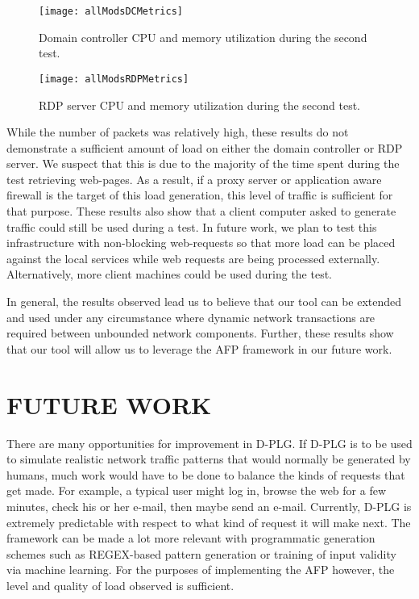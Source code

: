 \begin{figure}[!ht] \centering
  \texttt{[image: allModsDCMetrics]}
  \caption[Test 2:  Domain Controller Metrics]{Domain controller CPU and memory
  utilization during the second test.}
  \label{fig:allModsDCMetrics}
\end{figure}

\begin{figure}[!ht] \centering
  \texttt{[image: allModsRDPMetrics]}
  \caption[Test 2: RDP Metrics]{RDP server CPU and memory utilization during
  the second test.}
  \label{fig:allModsRDPMetrics}
\end{figure}

While the number of packets was relatively high, these results do not
demonstrate a sufficient amount of load on either the domain controller or RDP
server.  We suspect that this is due to the majority of the time spent during
the test retrieving web-pages.  As a result, if a proxy server or application
aware firewall is the target of this load generation, this level of traffic is
sufficient for that purpose.  These results also show that a client computer
asked to generate traffic could still be used during a test.  In future work,
we plan to test this infrastructure with non-blocking web-requests so that more
load can be placed against the local services while web requests are being
processed externally.  Alternatively, more client machines could be used during
the test.

In general, the results observed lead us to believe that our tool can be
extended and used under any circumstance where dynamic network transactions are
required between unbounded network components.  Further, these results show
that our tool will allow us to leverage the AFP framework in our future work.

\section{\uppercase{Future Work}} \label{sec:futureWork}
\noindent There are many opportunities for improvement in D-PLG.  If D-PLG is
to be used to simulate realistic network traffic patterns that would normally
be generated by humans, much work would have to be done to balance the kinds of
requests that get made.  For example, a typical user might log in, browse the
web for a few minutes, check his or her e-mail, then maybe send an e-mail.
Currently, D-PLG is extremely predictable with respect to what kind of request
it will make next.  The framework can be made a lot more relevant with
programmatic generation schemes such as REGEX-based pattern generation or
training of input validity via machine learning.  For the purposes of
implementing the AFP however, the level and quality of load observed is
sufficient.

